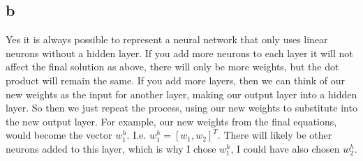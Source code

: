 \documentclass{article}
\begin{document}
\subsection{b}
Yes it is always possible to represent a neural network that only uses
linear neurons without a hidden layer. If you add more neurons to each
layer it will not affect the final solution as above, there will only be
more weights, but the dot product will remain the same. If you add more layers,
then we can think of our new weights as the input for another layer, making
our output layer into a hidden layer. So then we just repeat the process,
using our new weights to substitute into the new output layer. For example,
our new weights from the final equations, would become the vector $w_1^h$.
I.e. $w_1^h=[w_1,w_2]^T$. There will likely be other neurons added to this
layer, which is why I chose $w_1^h$, I could have also chosen $w_2^h$.
\end{document}
